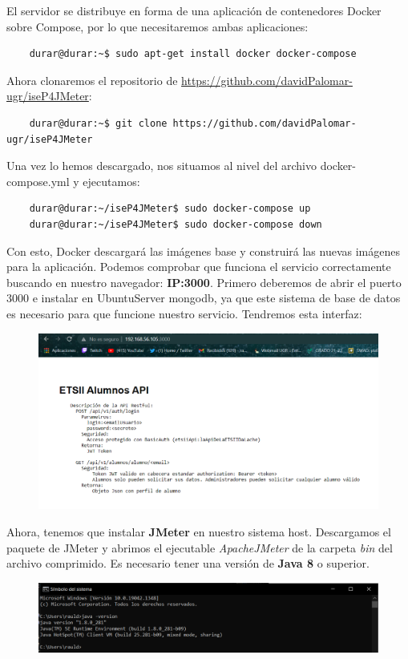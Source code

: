 \documentclass[a4paper]{article}
\begin{document}
El servidor se distribuye en forma de  una aplicación de contenedores Docker sobre
Compose, por lo que necesitaremos ambas aplicaciones:
\begin{lstlisting}
    durar@durar:~$ sudo apt-get install docker docker-compose
\end{lstlisting}
Ahora clonaremos el repositorio de \href{https://github.com/davidPalomar-ugr/iseP4JMeter}{https://github.com/davidPalomar-ugr/iseP4JMeter}:
\begin{lstlisting}
    durar@durar:~$ git clone https://github.com/davidPalomar-ugr/iseP4JMeter
\end{lstlisting}
Una vez lo hemos descargado, nos situamos al nivel del archivo docker-compose.yml y ejecutamos:
\begin{lstlisting}
    durar@durar:~/iseP4JMeter$ sudo docker-compose up
    durar@durar:~/iseP4JMeter$ sudo docker-compose down
\end{lstlisting}
Con esto, Docker descargará las imágenes base y construirá las nuevas imágenes para
la aplicación. 
Podemos comprobar que funciona el servicio correctamente buscando en nuestro navegador:
\textbf{IP:3000}. Primero deberemos de abrir el puerto 3000 e instalar en UbuntuServer
mongodb, ya que este sistema de base de datos es necesario para que funcione nuestro servicio. 
Tendremos esta interfaz: \newline
\begin{figure}[hbt!]
    \centering
    \includegraphics[width=\textwidth]{direccion docker.png}
\end{figure}
\newpage
Ahora, tenemos que instalar \textbf{JMeter} en nuestro sistema host.
Descargamos el paquete de JMeter y abrimos el ejecutable \textsl{ApacheJMeter} de la carpeta \textsl{bin} del 
archivo comprimido. Es necesario tener una versión de \textbf{Java 8} o superior.
\begin{figure}[hbt!]
    \centering
    \includegraphics[width=\textwidth]{version java.png}
\end{figure}
\end{document}
